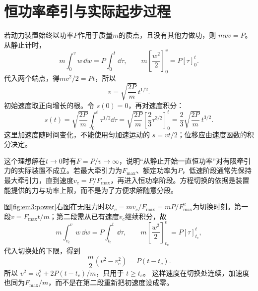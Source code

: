 \section{恒功率牵引与实际起步过程}

若动力装置始终以功率$P$作用于质量$m$的质点，且没有其他力做功，则 $mv\dot v=P$。从静止计时，
\[
m\int_0^{v}w\,\dd w=P\int_0^t\dd\tau,
\qquad m\left[\frac{w^2}{2}\right]_0^v=P[\tau]_0^t.
\]
代入两个端点，得$mv^2/2=Pt$，所以
\[
v=\sqrt{\frac{2P}{m}}\,t^{1/2}.
\]
初始速度取正向增长的根。令 $s(0)=0$，再对速度积分：
\[
s(t)=\sqrt{\frac{2P}{m}}\int_0^t\tau^{1/2}\dd\tau
=\sqrt{\frac{2P}{m}}\left[\frac23\tau^{3/2}\right]_0^t
=\frac23\sqrt{\frac{2P}{m}}\,t^{3/2}.
\]
这里加速度随时间变化，不能使用匀加速运动的 $s=vt/2$；位移应由速度函数的积分决定。

这个理想解在$t\to0$时有$F=P/v\to\infty$，说明“从静止开始一直恒功率”对有限牵引力的实际装置不成立。若最大牵引力为$F_{\max}$、额定功率为$P$，低速阶段通常先保持最大牵引力，直到速度$v_c=P/F_{\max}$，再进入恒功率阶段。方程切换的依据是装置能提供的力与功率上限，而不是为了方便求解随意分段。


图\ref{fig:em3:power}右图在无阻力时以$t_c=mv_c/F_{\max}=mP/F_{\max}^2$为切换时刻。第一段$v=F_{\max}t/m$；第二段需从已有速度$v_c$继续积分，故
\[
m\int_{v_c}^v w\,\dd w=P\int_{t_c}^{t}\dd\tau,
\qquad m\left[\frac{w^2}{2}\right]_{v_c}^v=P[\tau]_{t_c}^t,
\]
代入切换处的下限，得到
\[
\frac m2(v^2-v_c^2)=P(t-t_c).
\]
所以 $v^2=v_c^2+2P(t-t_c)/m$，只用于 $t\ge t_c$。
这样速度在切换处连续，加速度也同为$F_{\max}/m$，而不是在第二段重新把初速度设成零。


